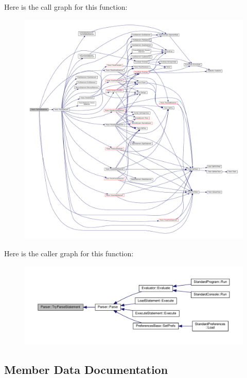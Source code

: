 Here is the call graph for this function\+:
\nopagebreak
\begin{figure}[H]
\begin{center}
\leavevmode
\includegraphics[width=350pt]{d0/d40/classParser_aeef41071b484e09942290ab55953dc4f_cgraph}
\end{center}
\end{figure}




Here is the caller graph for this function\+:
\nopagebreak
\begin{figure}[H]
\begin{center}
\leavevmode
\includegraphics[width=350pt]{d0/d40/classParser_aeef41071b484e09942290ab55953dc4f_icgraph}
\end{center}
\end{figure}




\subsection{Member Data Documentation}
